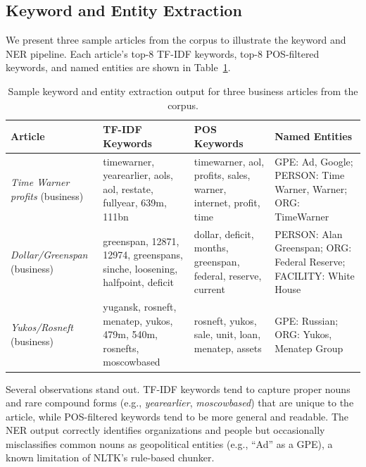 
\subsection{Keyword and Entity Extraction}

We present three sample articles from the corpus to illustrate the keyword and NER pipeline. Each article's top-8 TF-IDF keywords, top-8 POS-filtered keywords, and named entities are shown in Table~\ref{tab:samples}.

\begin{table}[t]
\centering
\begin{tabular}{p{2.4cm}p{4.8cm}p{4.8cm}p{3.2cm}}
\toprule
\textbf{Article} & \textbf{TF-IDF Keywords} & \textbf{POS Keywords} & \textbf{Named Entities} \\
\midrule
\textit{Time Warner profits} (business)
  & timewarner, yearearlier, aols, aol, restate, fullyear, 639m, 111bn
  & timewarner, aol, profits, sales, warner, internet, profit, time
  & GPE: Ad, Google; PERSON: Time Warner, Warner; ORG: TimeWarner \\
\addlinespace
\textit{Dollar/Greenspan} (business)
  & greenspan, 12871, 12974, greenspans, sinche, loosening, halfpoint, deficit
  & dollar, deficit, months, greenspan, federal, reserve, current
  & PERSON: Alan Greenspan; ORG: Federal Reserve; FACILITY: White House \\
\addlinespace
\textit{Yukos/Rosneft} (business)
  & yugansk, rosneft, menatep, yukos, 479m, 540m, rosnefts, moscowbased
  & rosneft, yukos, sale, unit, loan, menatep, assets
  & GPE: Russian; ORG: Yukos, Menatep Group \\
\bottomrule
\end{tabular}
\caption{Sample keyword and entity extraction output for three business articles from the corpus.}
\label{tab:samples}
\end{table}

Several observations stand out. TF-IDF keywords tend to capture proper nouns and rare compound forms (e.g., \textit{yearearlier}, \textit{moscowbased}) that are unique to the article, while POS-filtered keywords tend to be more general and readable. The NER output correctly identifies organizations and people but occasionally misclassifies common nouns as geopolitical entities (e.g., ``Ad'' as a GPE), a known limitation of NLTK's rule-based chunker.

